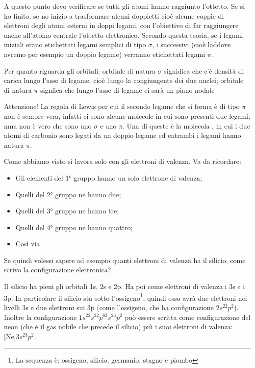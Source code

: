 A questo punto devo verificare se tutti gli atomi hanno raggiunto l'ottetto. Se si ho finito, se no inizio a trasformare alcuni doppietti cioè alcune coppie di elettroni degli atomi esterni in doppi legami, con l'obiettivo di far raggiungere anche all'atomo centrale l'ottetto elettronico. Secondo questa teoria, se i  legami iniziali erano etichettati legami semplici di tipo $\sigma$, i successivi (cioè laddove avremo per esempio un doppio legame) verranno etichettati legami $\pi$.

Per quanto riguarda gli orbitali: orbitale di natura $\sigma$ signidica che c'è densità di carica lungo l'asse di legame, cioè lungo la congiungente dei due nuclei; orbitale di natura $\pi$ signfica che lungo l'asse di legame ci sarà un piano nodale

Attenzione! La regola di Lewis per cui il secondo legame che si forma è di tipo $\pi$ non è sempre vera, infatti ci sono alcune molecole in cui sono presenti due legami, nma non è vero che sono uno $\sigma$ e uno $\pi$. Una di queste è la molecola , in cui i due atomi di carbonio sono legati da un doppio legame ed entrambi i legami hanno natura $\pi$.

Come abbiamo visto si lavora solo con gli elettroni di valenza. Va da ricordare:
\begin{itemize}
    \item Gli elementi del 1° gruppo hanno un solo elettrone di valenza;
    \item Quelli del 2° gruppo ne hanno due;
    \item Quelli del 3° gruppo ne hanno tre;
    \item Quelli del 4° gruppo ne hanno quattro;
    \item Così via
\end{itemize}

Se quindi volessi sapere ad esempio quanti elettroni di valenza ha il silicio, come scrivo la configurazione elettronica?

Il silicio ha pieni gli orbitali 1s, 2s e 2p. Ha poi come elettroni di valenza i 3s e i 3p. In particolare il silicio sta sotto l'ossigeno\footnote{La sequenza è: ossigeno, silicio, germanio, stagno e piombo}, quindi esso avrà due elettroni nei livelli 3s e due elettroni sui 3p (come l'ossigeno, che ha configurazione $2s^22p^2$). Inoltre la configurazione $1s^22s^22p^63s^23p^2$ può essere scritta come configurazione del neon (che è il gas nobile che precede il silicio) più i suoi elettroni di valenza: $\text{[Ne]}3s^23p^2$.
